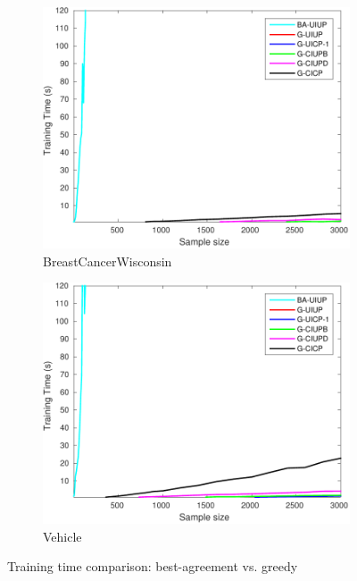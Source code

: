 \begin{figure}
	\centering

  \begin{subfigure}[b]{0.45\textwidth}
		\centering
  	\includegraphics[width=\textwidth]{figs/PLPTF/Time/Trees/BreastCancerWisconsinDownsampled.pdf}
  	\caption{BreastCancerWisconsin}
		\label{fig:BreastCancerWisconsin_T}
	\end{subfigure}
  \begin{subfigure}[b]{0.45\textwidth}
		\centering
  	\includegraphics[width=\textwidth]{figs/PLPTF/Time/Trees/VehicleDownsampledFurther.pdf}
  	\caption{Vehicle}
		\label{fig:Vehicle_T}
	\end{subfigure} 

  \caption{Training time comparison: best-agreement vs. greedy}
  \label{fig:trees_time}
\end{figure}

